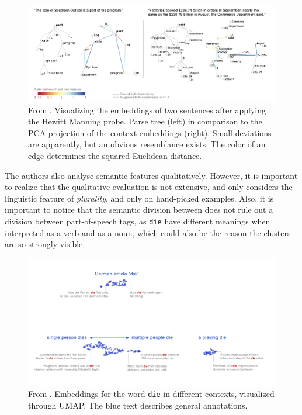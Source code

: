 \documentclass[a4paper,12pt,twoside,openright]{report}
\begin{document}
\begin{figure}[H]
	\center
  \includegraphics[width=\linewidth]{./assets/relatedwork/BERT_tree.png}
  \caption{From \cite{coenen19}. Visualizing the embeddings of two sentences after applying the Hewitt Manning probe. Parse tree (left) in comparison to the PCA projection of the context embeddings (right). Small deviations are apparently, but an obvious resemblance exists. The color of an edge determines the squared Euclidean distance.}
  \label{fig:BERT_tree}
\end{figure}

The authors also analyse semantic features qualitatively.
However, it is important to realize that the qualitative evaluation is not extensive, and only considers the linguistic feature of \textit{plurality}, and only on hand-picked examples.
Also, it is important to notice that the semantic division between does not rule out a division between part-of-speech tags, as \texttt{die} have different meanings when interpreted as a verb and as a noun, which could also be the reason the clusters are so strongly visible.

\begin{figure}[H]
	\center
  \includegraphics[width=\linewidth]{./assets/relatedwork/BERT_plurality.png}
  \caption{From \cite{coenen19}. Embeddings for the word \texttt{die} in different contexts, visualized through UMAP. The blue text describes general annotations.}
  \label{fig:BERT_plurality}
\end{figure}
\end{document}
